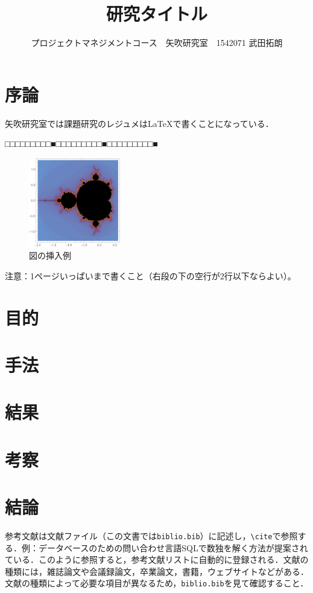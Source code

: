 \documentclass[uplatex,twocolumn,dvipdfmx]{jsarticle}
\title{\vspace{-5mm}\fontsize{14pt}{0pt}\selectfont 研究タイトル}
\author{\normalsize プロジェクトマネジメントコース　矢吹研究室　1542071 武田拓朗}
\date{}
\begin{document}
\fontsize{10.5pt}{\baselineskip}\selectfont
\maketitle





\section{序論}

矢吹研究室では課題研究のレジュメは\LaTeX で書くことになっている．

\noindent
□□□□□□□□□■□□□□□□□□□■□□□□□□□□□■

\begin{figure}[h]
\centering
\includegraphics[width=4cm,clip]{figure.pdf}
\caption{図の挿入例}\label{サンプル図}
\end{figure}

\noindent
注意：1ページいっぱいまで書くこと（右段の下の空行が2行以下ならよい）。

\section{目的}

\section{手法}

\section{結果}

\section{考察}

\section{結論}

参考文献は文献ファイル（この文書では\verb|biblio.bib|）に記述し，\verb|\cite|で参照する．例：データベースのための問い合わせ言語SQLで数独を解く方法が提案されている\cite{yabuki2011}．このように参照すると，参考文献リストに自動的に登録される．文献の種類には，雑誌論文\cite{yabuki2011}や会議録論文\cite{yabuki2013}，卒業論文\cite{kubo2014}，書籍\cite{okumura2013}，ウェブサイト\cite{self}などがある．文献の種類によって必要な項目が異なるため，\verb|biblio.bib|を見て確認すること．


\end{document}
